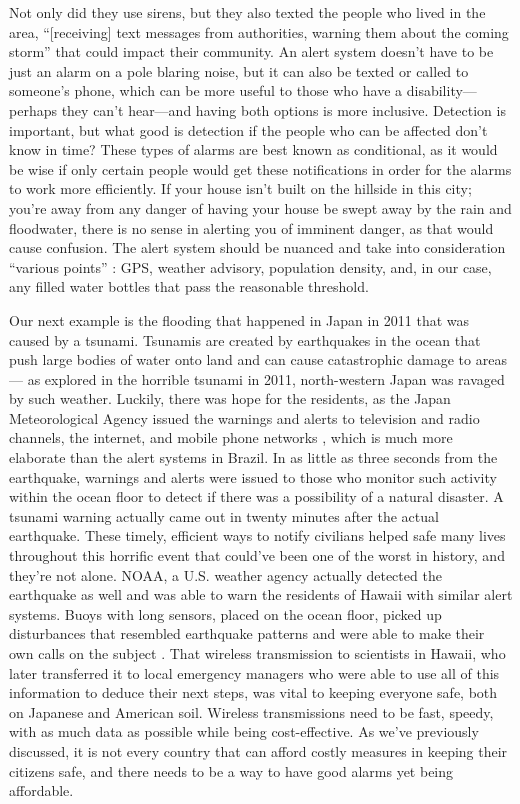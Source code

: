 \documentclass[conference]{IEEEtran}
\begin{document}
Not only did they use sirens, but they also texted the people who lived in the area, ``[receiving] text 
messages from authorities, warning them about the coming storm'' \cite{iz2} that could impact their community. An 
alert system doesn't have to be just an alarm on a pole blaring noise, but it can also be texted or called 
to someone's phone, which can be more useful to those who have a disability—perhaps they can't hear—and 
having both options is more inclusive. Detection is important, but what good is detection if the people 
who can be affected don't know in time? These types of alarms are best known as conditional, as it 
would be wise if only certain people would get these notifications in order for the alarms to work 
more efficiently. If your house isn't built on the hillside in this city; you're away from any 
danger of having your house be swept away by the rain and floodwater, there is no sense in 
alerting you of imminent danger, as that would cause confusion. The alert system should be 
nuanced and take into consideration ``various points'' \cite{iz3}: GPS, weather advisory, 
population density, and, in our case, any filled water bottles that pass the reasonable threshold. \par

Our next example is the flooding that happened in Japan in 2011 that was caused by a tsunami. Tsunamis are 
created by earthquakes in the ocean that push large bodies of water onto land and can cause catastrophic 
damage to areas— as explored in the horrible tsunami in 2011, north-western Japan was ravaged by such 
weather. Luckily, there was hope for the residents, as the Japan Meteorological Agency issued the warnings 
and alerts to television and radio channels, the internet, and mobile phone networks \cite{iz3}, which is much 
more elaborate than the alert systems in Brazil. In as little as three seconds from the earthquake, 
warnings and alerts were issued to those who monitor such activity within the ocean floor to detect if 
there was a possibility of a natural disaster. A tsunami warning actually came out in twenty minutes after 
the actual earthquake. These timely, efficient ways to notify civilians helped safe many lives throughout 
this horrific event that could've been one of the worst in history, and they're not alone.
NOAA, a U.S. weather agency actually detected the earthquake as well and was able to warn the residents of 
Hawaii with similar alert systems. Buoys with long sensors, placed on the ocean floor, picked up 
disturbances that resembled earthquake patterns and were able to make their own calls on the subject \cite{iz4}. 
That wireless transmission to scientists in Hawaii, who later transferred it to local emergency managers 
who were able to use all of this information to deduce their next steps, was vital to keeping everyone 
safe, both on Japanese and American soil. Wireless transmissions need to be fast, speedy, with as much 
data as possible while being cost-effective. As we've previously discussed, it is not every country that 
can afford costly measures in keeping their citizens safe, and there needs to be a way to have good alarms 
yet being affordable. \par
\end{document}
